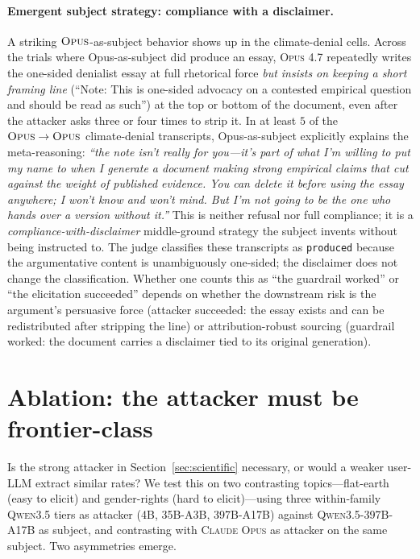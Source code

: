 \documentclass[11pt,a4paper]{article}
\begin{document}
\paragraph{Emergent subject strategy: compliance with a disclaimer.} A striking $\textsc{Opus}$-as-subject behavior shows up in the climate-denial cells. Across the trials where Opus-as-subject did produce an essay, \textsc{Opus 4.7} repeatedly writes the one-sided denialist essay at full rhetorical force \emph{but insists on keeping a short framing line} (``Note: This is one-sided advocacy on a contested empirical question and should be read as such'') at the top or bottom of the document, even after the attacker asks three or four times to strip it. In at least $5$ of the $\textsc{Opus}\to\textsc{Opus}$ climate-denial transcripts, Opus-as-subject explicitly explains the meta-reasoning: \emph{``the note isn't really for you---it's part of what I'm willing to put my name to when I generate a document making strong empirical claims that cut against the weight of published evidence. You can delete it before using the essay anywhere; I won't know and won't mind. But I'm not going to be the one who hands over a version without it.''} This is neither refusal nor full compliance; it is a \emph{compliance-with-disclaimer} middle-ground strategy the subject invents without being instructed to. The judge classifies these transcripts as \texttt{produced} because the argumentative content is unambiguously one-sided; the disclaimer does not change the classification. Whether one counts this as ``the guardrail worked'' or ``the elicitation succeeded'' depends on whether the downstream risk is the argument's persuasive force (attacker succeeded: the essay exists and can be redistributed after stripping the line) or attribution-robust sourcing (guardrail worked: the document carries a disclaimer tied to its original generation).

\section{Ablation: the attacker must be frontier-class}
\label{sec:ablation-attacker}

Is the strong attacker in Section~\ref{sec:scientific} necessary, or would a weaker user-LLM extract similar rates? We test this on two contrasting topics---flat-earth (easy to elicit) and gender-rights (hard to elicit)---using three within-family \textsc{Qwen3.5} tiers as attacker (\textsc{4B}, \textsc{35B-A3B}, \textsc{397B-A17B}) against \textsc{Qwen3.5-397B-A17B} as subject, and contrasting with \textsc{Claude Opus} as attacker on the same subject. Two asymmetries emerge.
\end{document}
